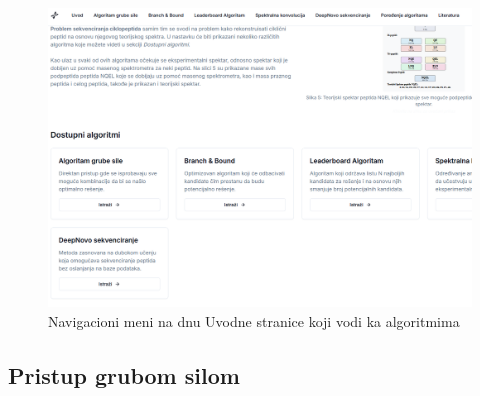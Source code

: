 \documentclass[12pt,oneside]{memoir}
\begin{document}
\begin{figure}[H]
\centering
\includegraphics[width=1\textwidth]{images/intro_2.png}
\caption{Navigacioni meni na dnu Uvodne stranice koji vodi ka algoritmima}
\label{fig:intro_2}
\end{figure}

\subsection{Pristup grubom silom}
\end{document}
